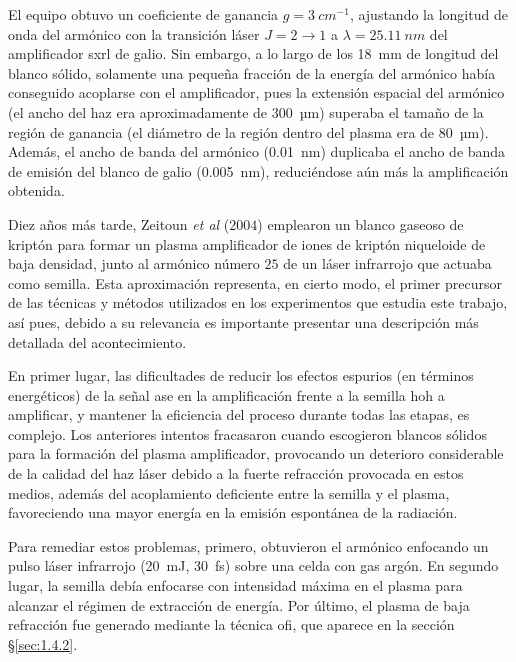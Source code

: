 El equipo obtuvo un coeficiente de ganancia $g = \qty{3}{cm^{-1}}$, ajustando la longitud de onda del armónico con la transición láser $J=2 \rightarrow 1$ a $\lambda = \qty{25.11}{nm}$ del amplificador \acrshort{sxrl} de galio. Sin embargo, a lo largo de los \qty{18}{mm} de longitud del blanco sólido, solamente una pequeña fracción de la energía del armónico había conseguido acoplarse con el amplificador, pues la extensión espacial del armónico (el ancho del haz era aproximadamente de \qty{300}{µm}) superaba el tamaño de la región de ganancia (el diámetro de la región dentro del plasma era de \qty{80}{µm}). Además, el ancho de banda del armónico (\qty{0.01}{nm}) duplicaba el ancho de banda de emisión del blanco de galio (\qty{0.005}{nm}), reduciéndose aún más la amplificación obtenida.

Diez años más tarde, Zeitoun \emph{et al} ($2004$)\autocite{Zeitoun2004} emplearon un blanco gaseoso de kriptón para formar un plasma amplificador de iones de kriptón niqueloide de baja densidad, junto al armónico número $25$ de un láser infrarrojo que actuaba como semilla. Esta aproximación representa, en cierto modo, el primer precursor de las técnicas y métodos utilizados en los experimentos que estudia este trabajo, así pues, debido a su relevancia es importante presentar una descripción más detallada del acontecimiento.

En primer lugar, las dificultades de reducir los efectos espurios (en términos energéticos) de la señal \acrshort{ase} en la amplificación frente a la semilla \acrshort{hoh} a amplificar, y mantener la eficiencia del proceso durante todas las etapas, es complejo. Los anteriores intentos fracasaron cuando escogieron blancos sólidos para la formación del plasma amplificador, provocando un deterioro considerable de la calidad del haz láser debido a la fuerte refracción provocada en estos medios, además del acoplamiento deficiente entre la semilla y el plasma, favoreciendo una mayor energía en la emisión espontánea de la radiación.

Para remediar estos problemas, primero, obtuvieron el armónico enfocando un pulso láser infrarrojo (\qty{20}{mJ}, \qty{30}{fs}) sobre una celda con gas argón. En segundo lugar, la semilla debía enfocarse con intensidad máxima en el plasma para alcanzar el régimen de extracción de energía. Por último, el plasma de baja refracción fue generado mediante la técnica \acrfull{ofi}, que aparece en la sección \S\ref{sec:1.4.2}.

